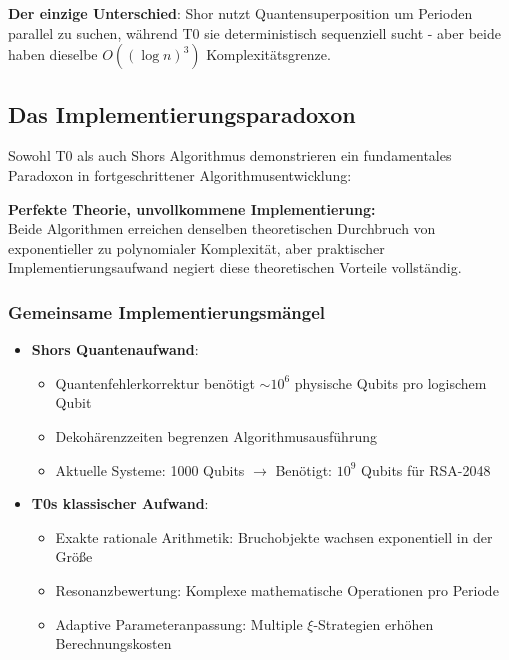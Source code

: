 	\textbf{Der einzige Unterschied}: Shor nutzt Quantensuperposition um Perioden parallel zu suchen, während T0 sie deterministisch sequenziell sucht - aber beide haben dieselbe $O((\log n)^3)$ Komplexitätsgrenze.
	
	\subsection{Das Implementierungsparadoxon}
	
	Sowohl T0 als auch Shors Algorithmus demonstrieren ein fundamentales Paradoxon in fortgeschrittener Algorithmusentwicklung:
	
	\begin{tcolorbox}[colback=yellow!10,colframe=orange!50,title=Kernproblem]
		\textbf{Perfekte Theorie, unvollkommene Implementierung:} \\
		Beide Algorithmen erreichen denselben theoretischen Durchbruch von exponentieller zu polynomialer Komplexität, aber praktischer Implementierungsaufwand negiert diese theoretischen Vorteile vollständig.
	\end{tcolorbox}
	
	\subsubsection{Gemeinsame Implementierungsmängel}
	\begin{itemize}
		\item \textbf{Shors Quantenaufwand}: 
		\begin{itemize}
			\item Quantenfehlerkorrektur benötigt $\sim 10^6$ physische Qubits pro logischem Qubit
			\item Dekohärenzzeiten begrenzen Algorithmusausführung
			\item Aktuelle Systeme: 1000 Qubits $\rightarrow$ Benötigt: $10^9$ Qubits für RSA-2048
		\end{itemize}
		
		\item \textbf{T0s klassischer Aufwand}:
		\begin{itemize}
			\item Exakte rationale Arithmetik: Bruchobjekte wachsen exponentiell in der Größe
			\item Resonanzbewertung: Komplexe mathematische Operationen pro Periode
			\item Adaptive Parameteranpassung: Multiple $\xi$-Strategien erhöhen Berechnungskosten
		\end{itemize}
	\end{itemize}
	
